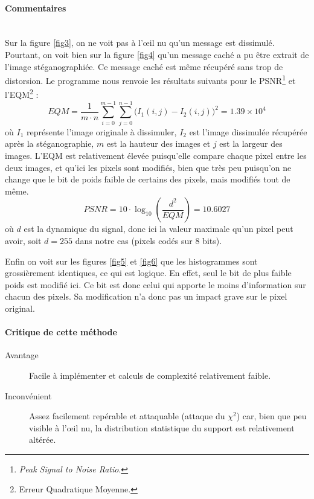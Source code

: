 \paragraph{Commentaires}~\\\indent
Sur la figure \ref{fig3}, on ne voit pas à l'\oe il nu qu'un message est dissimulé. Pourtant, on voit bien sur la figure \ref{fig4} qu'un message caché a pu être extrait de l'image stéganographiée. Ce message caché est même récupéré sans trop de distorsion. Le programme nous renvoie les résultats suivants pour le PSNR\footnote{\emph{Peak Signal to Noise Ratio}.} et l'EQM\footnote{Erreur Quadratique Moyenne.} : 
$$ EQM = \frac{1}{m\cdot n}\sum_{i=0}^{m-1}\sum_{j=0}^{n-1}\big(I_1(i,j)-I_2(i,j) \big)^2 = 1.39\times 10^4$$
où $I_1$ représente l'image originale à dissimuler, $I_2$ est l'image dissimulée récupérée après la stéganographie, $m$ est la hauteur des images et $j$ est la largeur des images. L'EQM est relativement élevée puisqu'elle compare chaque pixel entre les deux images, et qu'ici les pixels sont modifiés, bien que très peu puisqu'on ne change que le bit de poids faible de certains des pixels, mais modifiés tout de même.
$$PSNR = 10\cdot \log_{10}\left(\frac{d^2}{EQM}\right) = 10.6027 $$
où $d$ est la dynamique du signal, donc ici la valeur maximale qu'un pixel peut avoir, soit $d=255$ dans notre cas (pixels codés sur 8 bits).

Enfin on voit sur les figures \ref{fig5} et \ref{fig6} que les histogrammes sont grossièrement identiques, ce qui est logique. En effet, seul le bit de plus faible poids est modifié ici. Ce bit est donc celui qui apporte le moins d'information sur chacun des pixels. Sa modification n'a donc pas un impact grave sur le pixel original.

\paragraph{Critique de cette méthode}
\begin{description}
\item[Avantage] Facile à implémenter et calculs de complexité relativement faible.
\item[Inconvénient] Assez facilement repérable et attaquable (attaque du $\chi^2$) car, bien que peu visible à l'\oe il nu, la distribution statistique du support est relativement altérée. 
\end{description}
